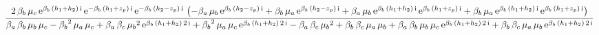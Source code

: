 \documentclass[9pt]{article}
\begin{document}
  \begin{equation}
    \centering
    \frac{2\, \mathrm{\beta}_{b}\, \mathrm{\mu}_{c}\, \mathrm{e}^{\mathrm{\beta}_{b}\, \left(h_{1} + h_{2}\right)\, \mathrm{i}}\, \mathrm{e}^{- \mathrm{\beta}_{b}\, \left(h_{1} + z_{p}\right)\, \mathrm{i}}\, \mathrm{e}^{- \mathrm{\beta}_{b}\, \left(h_{2} - z_{p}\right)\, \mathrm{i}}\, \left( - \mathrm{\beta}_{a}\, \mathrm{\mu}_{b}\, \mathrm{e}^{\mathrm{\beta}_{b}\, \left(h_{2} - z_{p}\right)\, \mathrm{i}} + \mathrm{\beta}_{b}\, \mathrm{\mu}_{a}\, \mathrm{e}^{\mathrm{\beta}_{b}\, \left(h_{2} - z_{p}\right)\, \mathrm{i}} + \mathrm{\beta}_{a}\, \mathrm{\mu}_{b}\, \mathrm{e}^{\mathrm{\beta}_{b}\, \left(h_{1} + h_{2}\right)\, \mathrm{i}}\, \mathrm{e}^{\mathrm{\beta}_{b}\, \left(h_{1} + z_{p}\right)\, \mathrm{i}} + \mathrm{\beta}_{b}\, \mathrm{\mu}_{a}\, \mathrm{e}^{\mathrm{\beta}_{b}\, \left(h_{1} + h_{2}\right)\, \mathrm{i}}\, \mathrm{e}^{\mathrm{\beta}_{b}\, \left(h_{1} + z_{p}\right)\, \mathrm{i}}\right)}{\mathrm{\beta}_{a}\, \mathrm{\beta}_{b}\, \mathrm{\mu}_{b}\, \mathrm{\mu}_{c} - {\mathrm{\beta}_{b}}^2\, \mathrm{\mu}_{a}\, \mathrm{\mu}_{c} + \mathrm{\beta}_{a}\, \mathrm{\beta}_{c}\, {\mathrm{\mu}_{b}}^2\, \mathrm{e}^{\mathrm{\beta}_{b}\, \left(h_{1} + h_{2}\right)\, 2\, \mathrm{i}} + {\mathrm{\beta}_{b}}^2\, \mathrm{\mu}_{a}\, \mathrm{\mu}_{c}\, \mathrm{e}^{\mathrm{\beta}_{b}\, \left(h_{1} + h_{2}\right)\, 2\, \mathrm{i}} - \mathrm{\beta}_{a}\, \mathrm{\beta}_{c}\, {\mathrm{\mu}_{b}}^2 + \mathrm{\beta}_{b}\, \mathrm{\beta}_{c}\, \mathrm{\mu}_{a}\, \mathrm{\mu}_{b} + \mathrm{\beta}_{a}\, \mathrm{\beta}_{b}\, \mathrm{\mu}_{b}\, \mathrm{\mu}_{c}\, \mathrm{e}^{\mathrm{\beta}_{b}\, \left(h_{1} + h_{2}\right)\, 2\, \mathrm{i}} + \mathrm{\beta}_{b}\, \mathrm{\beta}_{c}\, \mathrm{\mu}_{a}\, \mathrm{\mu}_{b}\, \mathrm{e}^{\mathrm{\beta}_{b}\, \left(h_{1} + h_{2}\right)\, 2\, \mathrm{i}}}
    \label{eq:X4}
  \end{equation}
\end{document}
